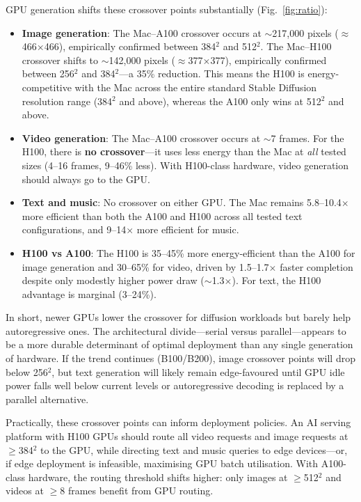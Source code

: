 \documentclass[11pt]{article}
\begin{document}
GPU generation shifts these crossover points substantially (Fig.~\ref{fig:ratio}):

\begin{itemize}[leftmargin=*]
\item \textbf{Image generation}: The Mac--A100 crossover occurs at $\sim$217,000 pixels ($\approx$466$\times$466), empirically confirmed between 384$^2$ and 512$^2$. The Mac--H100 crossover shifts to $\sim$142,000 pixels ($\approx$377$\times$377), empirically confirmed between 256$^2$ and 384$^2$---a 35\% reduction. This means the H100 is energy-competitive with the Mac across the entire standard Stable Diffusion resolution range (384$^2$ and above), whereas the A100 only wins at 512$^2$ and above.
\item \textbf{Video generation}: The Mac--A100 crossover occurs at $\sim$7 frames. For the H100, there is \textbf{no crossover}---it uses less energy than the Mac at \textit{all} tested sizes (4--16 frames, 9--46\% less). With H100-class hardware, video generation should always go to the GPU.
\item \textbf{Text and music}: No crossover on either GPU. The Mac remains 5.8--10.4$\times$ more efficient than both the A100 and H100 across all tested text configurations, and 9--14$\times$ more efficient for music.
\item \textbf{H100 vs A100}: The H100 is 35--45\% more energy-efficient than the A100 for image generation and 30--65\% for video, driven by 1.5--1.7$\times$ faster completion despite only modestly higher power draw ($\sim$1.3$\times$). For text, the H100 advantage is marginal (3--24\%).
\end{itemize}

In short, newer GPUs lower the crossover for diffusion workloads but barely help autoregressive ones. The architectural divide---serial versus parallel---appears to be a more durable determinant of optimal deployment than any single generation of hardware. If the trend continues (B100/B200), image crossover points will drop below 256$^2$, but text generation will likely remain edge-favoured until GPU idle power falls well below current levels or autoregressive decoding is replaced by a parallel alternative.

Practically, these crossover points can inform deployment policies. An AI serving platform with H100 GPUs should route all video requests and image requests at $\geq$384$^2$ to the GPU, while directing text and music queries to edge devices---or, if edge deployment is infeasible, maximising GPU batch utilisation. With A100-class hardware, the routing threshold shifts higher: only images at $\geq$512$^2$ and videos at $\geq$8 frames benefit from GPU routing.
\end{document}
